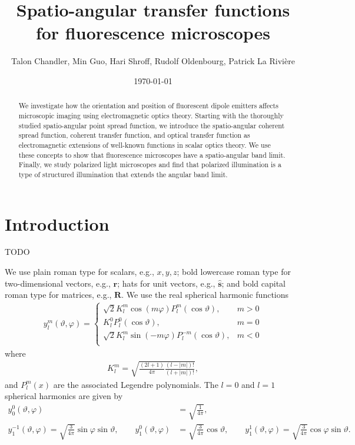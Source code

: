 \documentclass[11pt]{article}
\providecommand{\mb}[1]{\mathbf{#1}}
\begin{document}
\title{\vspace{-2.5em} Spatio-angular transfer functions for fluorescence microscopes\vspace{-1em}}  \author{Talon Chandler, Min Guo, Hari Shroff, Rudolf Oldenbourg, Patrick La Rivi\`ere}
\date{\vspace{-1em}\today\vspace{-1em}}
\maketitle
\begin{abstract}
  We investigate how the orientation and position of fluorescent dipole emitters
  affects microscopic imaging using electromagnetic optics theory. Starting with
  the thoroughly studied spatio-angular point spread function, we introduce the
  spatio-angular coherent spread function, coherent transfer function, and
  optical transfer function as electromagnetic extensions of well-known
  functions in scalar optics theory. We use these concepts to show that
  fluorescence microscopes have a spatio-angular band limit. Finally, we study
  polarized light microscopes and find that polarized illumination is a type of
  structured illumination that extends the angular band limit.
\end{abstract}
\section{Introduction}
TODO

We use plain roman type for scalars, e.g., $x, y, z$; bold lowercase roman type
for two-dimensional vectors, e.g., $\mb{r}$; hats for unit vectors, e.g.,
$\mb{\hat{s}}$; and bold capital roman type for matrices, e.g.,
$\mb{R}$. We use the real spherical harmonic functions
\begin{align}
  y_l^m(\vartheta, \varphi) =
  \begin{cases}
    \sqrt{2}K_l^m\cos(m\varphi)P_l^m(\cos\vartheta), & m > 0\\
    K_l^0P_l^0(\cos\vartheta), & m = 0\\
    \sqrt{2}K_l^m\sin(-m\varphi)P_l^{-m}(\cos\vartheta), & m < 0\\
  \end{cases}
\end{align}
where
\begin{align}
  K_l^m = \sqrt{\frac{(2l+1)}{4\pi}\frac{(l-|m|)!}{(l+|m|)!}},
\end{align}
and $P_l^m(x)$ are the associated Legendre polynomials. The $l=0$ and $l=1$
spherical harmonics are given by
\begin{equation}
\begin{aligned}
  y_0^0(\vartheta, \varphi) &= \sqrt{\frac{1}{4\pi}},\\
  y_1^{-1}(\vartheta, \varphi) = \sqrt{\frac{3}{4\pi}}\sin\varphi\sin\vartheta, \hspace{2em} y_1^0(\vartheta, \varphi) &= \sqrt{\frac{3}{4\pi}}\cos\vartheta, \hspace{2em} y_1^1(\vartheta, \varphi) = \sqrt{\frac{3}{4\pi}}\cos\varphi\sin\vartheta. \label{eq:harmonics}
\end{aligned}
\end{equation}
\end{document}
